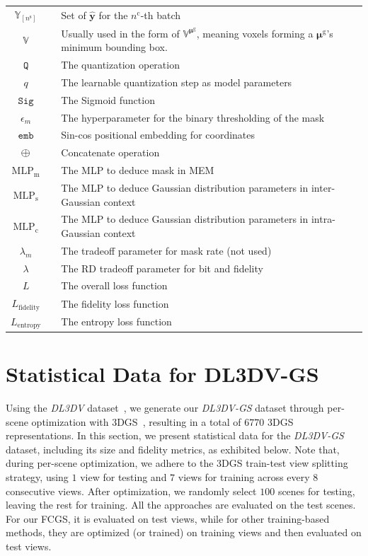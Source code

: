 \documentclass{article} %
\newcommand{\midoplus}{\mathlarger{\mathlarger{\oplus}}}
\begin{document}
\begin{table}[H]
\begin{tabular}{cll}
        $\mathbb{Y}_{[n^\text{s}]}$ &&Set of $\hat{\bm{y}}$ for the $n^\text{c}$-th batch  \\
        $\mathbb{V}$ &&Usually used in the form of $\mathbb{V}^{\bm{\mu}^\text{g}}$, meaning voxels forming a $\bm{\mu}^\text{g}$'s minimum bounding box.  \\
        $\texttt{Q}$ &&The quantization operation  \\
        $q$ &&The learnable quantization step as model parameters  \\
        $\texttt{Sig}$ &&The Sigmoid function  \\
        $\epsilon_m$ &&The hyperparameter for the binary thresholding of the mask  \\
        $\texttt{emb}$ &&Sin-cos positional embedding for coordinates \\
        $\midoplus$ &&Concatenate operation \\
        $\text{MLP}_\text{m}$ &&The MLP to deduce mask in MEM  \\
        $\text{MLP}_\text{s}$ &&The MLP to deduce Gaussian distribution parameters in inter-Gaussian context  \\
        $\text{MLP}_\text{c}$ &&The MLP to deduce Gaussian distribution parameters in intra-Gaussian context  \\
        $\lambda_m$ &&The tradeoff parameter for mask rate (not used)  \\
        $\lambda$ &&The RD tradeoff parameter for bit and fidelity  \\
        $L$ &&The overall loss function \\
        $L_{\text{fidelity}}$ &&The fidelity loss function \\
        $L_{\text{entropy}}$ &&The entropy loss function \\
    \bottomrule[2pt]
    \end{tabular}
    \label{tab:notation_table}
\end{table}
\clearpage

\section{Statistical Data for DL3DV-GS}
\label{sec:statistic_DL3DV-GS}

Using the \textit{DL3DV} dataset~\citep{DL3DV}, we generate our \textit{DL3DV-GS} dataset through per-scene optimization with 3DGS~\citep{3DGS}, resulting in a total of $6770$ 3DGS representations. In this section, we present statistical data for the \textit{DL3DV-GS} dataset, including its size and fidelity metrics, as exhibited below.
Note that, during per-scene optimization, we adhere to the 3DGS train-test view splitting strategy, using $1$ view for testing and $7$ views for training across every $8$ consecutive views. After optimization, we randomly select $100$ scenes for testing, leaving the rest for training. All the approaches are evaluated on the test scenes. For our FCGS, it is evaluated on test views, while for other training-based methods, they are optimized (or trained) on training views and then evaluated on test views.
\vspace{20pt}
\end{document}
